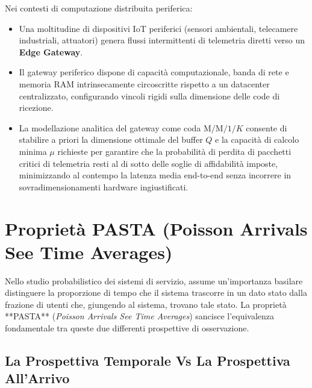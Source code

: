 \documentclass[11pt, a4paper]{article}
\begin{document}
Nei contesti di computazione distribuita periferica:
\begin{itemize}[noitemsep]
    \item Una moltitudine di dispositivi IoT periferici (sensori ambientali, telecamere industriali, attuatori) genera flussi intermittenti di telemetria diretti verso un \textbf{Edge Gateway}.
    \item Il gateway periferico dispone di capacità computazionale, banda di rete e memoria RAM intrinsecamente circoscritte rispetto a un datacenter centralizzato, configurando vincoli rigidi sulla dimensione delle code di ricezione.
    \item La modellazione analitica del gateway come coda $\text{M/M/1/}K$ consente di stabilire a priori la dimensione ottimale del buffer $Q$ e la capacità di calcolo minima $\mu$ richieste per garantire che la probabilità di perdita di pacchetti critici di telemetria resti al di sotto delle soglie di affidabilità imposte, minimizzando al contempo la latenza media end-to-end senza incorrere in sovradimensionamenti hardware ingiustificati.
\end{itemize}

\newpage

\section{Proprietà PASTA (Poisson Arrivals See Time Averages)}

Nello studio probabilistico dei sistemi di servizio, assume un'importanza basilare distinguere la proporzione di tempo che il sistema trascorre in un dato stato dalla frazione di utenti che, giungendo al sistema, trovano tale stato. La proprietà **PASTA** (\emph{Poisson Arrivals See Time Averages}) sancisce l'equivalenza fondamentale tra queste due differenti prospettive di osservazione.


\subsection{La Prospettiva Temporale Vs La Prospettiva All'Arrivo}
\end{document}
